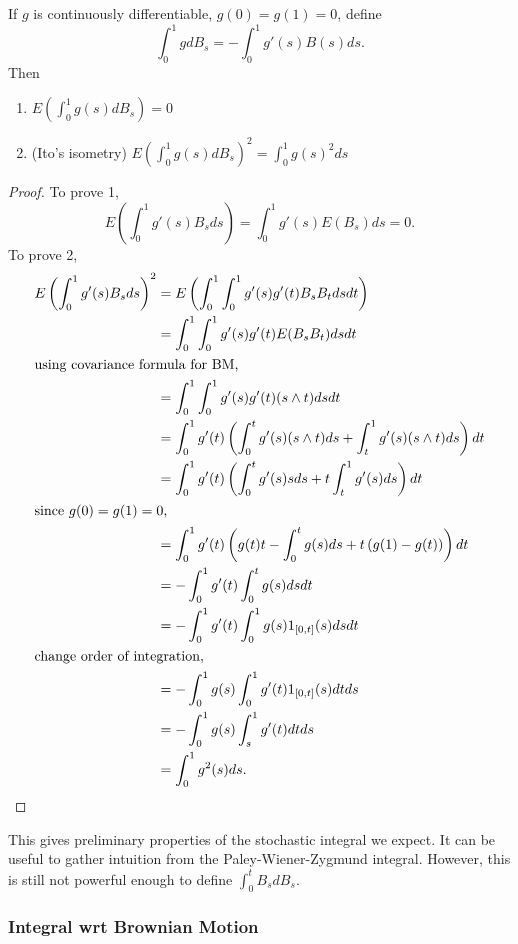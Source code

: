 \begin{definition}
	If $g$ is continuously differentiable, $g(0) = g(1) = 0$, define
	\[
		\int _0^1 g d B_s = - \int _0^1 g'(s) B(s) ds
	.\] 
	Then
	\begin{enumerate}
		\item $E\left( \int _0^1 g(s) d B_s  \right)  = 0$
		\item (Ito's isometry) $E\left( \int _0^1 g(s) d B_s \right) ^2 = \int _0^1 g(s)^2 ds$
	\end{enumerate}
\end{definition}
\begin{proof}
	To prove 1,
	\[
		E\left( \int _0^1 g'(s) B_s ds  \right) 
		= \int _0^1 g'(s) E(B_s) ds = 0
	.\] 
	To prove 2,
	\begin{align*}
		E\left( \int _0^1 g'(s) B_s ds \right) ^2
		&= E\left( \int _0^1 \int _0^1 g'(s) g'(t) B_s B_t ds dt \right)  \\
		&= \int _0^1 \int _0^1 g'(s) g'(t) E(B_s B_t) ds dt \\
		\intertext{using covariance formula for BM,}
		&= \int _0^1 \int _0^1 g'(s) g'(t) (s \wedge t) ds dt \\
		&= \int _0^1 g'(t) \left(\int _0^t g'(s) (s \wedge t) ds + \int _t^1 g'(s) (s \wedge t) ds \right) dt \\
		&= \int _0^1 g'(t) \left(\int _0^t g'(s) s ds + t \int _t^1 g'(s) ds \right) dt \\
		\intertext{since $g(0) = g(1) = 0$,}
		&= \int _0^1 g'(t) \left(g(t) t - \int _0^t g(s) ds + t\left( g(1) - g(t) \right) \right) dt \\
		&= - \int _0^1 g'(t) \int _0^t g(s) ds dt \\
		&= - \int _0^1 g'(t) \int _0^1 g(s) 1_{[0,t]}(s) ds dt \\
		\intertext{change order of integration,}
		&= - \int _0^1 g(s) \int_0^1 g'(t) 1_{[0,t]}(s) dt ds \\
		&= - \int _0^1 g(s) \int_s^1 g'(t) dt ds \\
		&= \int _0^1 g^2(s) ds
	.\end{align*}
\end{proof}

This gives preliminary properties of the stochastic integral we expect. It can be useful to gather intuition from the Paley-Wiener-Zygmund integral. However, this is still not powerful enough to define $\int _0^t B_s dB_s$.

\subsubsection{Integral wrt Brownian Motion}

